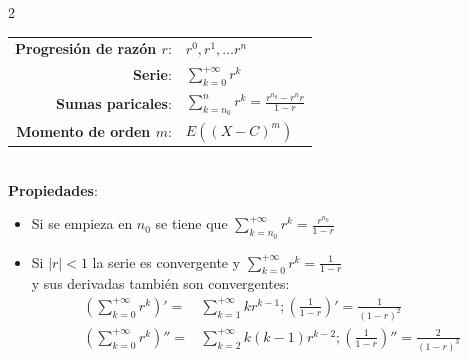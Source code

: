 \documentclass[10pt,a4paper]{article}
\begin{document}
\begin{tcolorbox}[title=Series Geométricas, equal height group=VA3]
    \begin{multicols}{2}
        \begin{tabular}{rl}
            \textbf{Progresión de razón $r$}: & $r^0, r^1, \ldots r^n$ \\
            \textbf{Serie}: & $\sum\limits_{k=0}^{+\infty}{r^k}$ \\
            \textbf{Sumas paricales}: & $\sum\limits_{k=n_0}^{n}{r^k} = \frac{r^{n_0} - r^n r}{1 - r}$ \\
            \textbf{Momento de orden $m$}: & $E({(X-C)}^m)$
        \end{tabular}
        \\
        \textbf{Propiedades}:
        \begin{itemize}
            \item Si se empieza en $n_0$ se tiene que $\sum\limits_{k=n_0}^{+\infty}{r^k} = {\frac{r^{n_0}}{1-r}}$
            \item Si $|r| < 1$ la serie es convergente y $\sum\limits_{k=0}^{+\infty}{r^k} = \frac{1}{1 - r}$ \\
            y sus derivadas también son convergentes:
            \begin{align*}
                {\left( \sum\limits_{k=0}^{+\infty}{r^k} \right)}'  = & \sum\limits_{k=1}^{+\infty}{kr^{k-1}}; {\left( \frac{1}{1-r} \right)}' = \frac{1}{{(1-r)}^2} \\
                {\left( \sum\limits_{k=0}^{+\infty}{r^k} \right)}'' = & \sum\limits_{k=2}^{+\infty}{k(k-1)r^{k-2}}; {\left( \frac{1}{1-r} \right)}'' = \frac{2}{{(1-r)}^3} \\
            \end{align*}
        \end{itemize}
    \end{multicols}
\end{tcolorbox}
\end{document}
